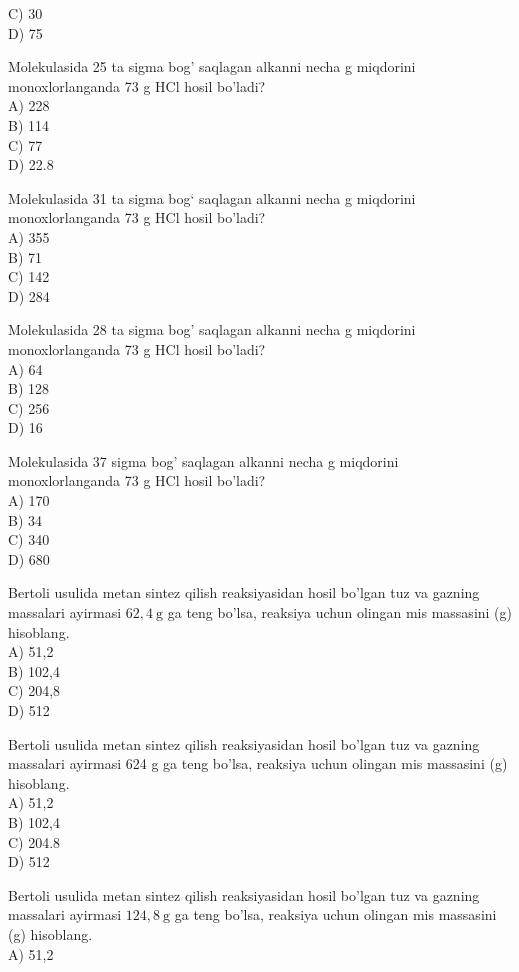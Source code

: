 C) 30\\
D) 75
  \item Molekulasida 25 ta sigma bog' saqlagan alkanni necha g miqdorini monoxlorlanganda 73 g HCl hosil bo'ladi?\\
A) 228\\
B) 114\\
C) 77\\
D) 22.8
  \item Molekulasida 31 ta sigma bog` saqlagan alkanni necha g miqdorini monoxlorlanganda 73 g HCl hosil bo'ladi?\\
A) 355\\
B) 71\\
C) 142\\
D) 284
  \item Molekulasida 28 ta sigma bog' saqlagan alkanni necha g miqdorini monoxlorlanganda 73 g HCl hosil bo'ladi?\\
A) 64\\
B) 128\\
C) 256\\
D) 16
  \item Molekulasida 37 sigma bog' saqlagan alkanni necha g miqdorini monoxlorlanganda 73 g HCl hosil bo'ladi?\\
A) 170\\
B) 34\\
C) 340\\
D) 680
  \item Bertoli usulida metan sintez qilish reaksiyasidan hosil bo'lgan tuz va gazning massalari ayirmasi $62,4 \mathrm{~g}$ ga teng bo'lsa, reaksiya uchun olingan mis massasini (g) hisoblang.\\
A) 51,2\\
B) 102,4\\
C) 204,8\\
D) 512
  \item Bertoli usulida metan sintez qilish reaksiyasidan hosil bo'lgan tuz va gazning massalari ayirmasi 624 g ga teng bo'lsa, reaksiya uchun olingan mis massasini (g) hisoblang.\\
A) 51,2\\
B) 102,4\\
C) 204.8\\
D) 512
  \item Bertoli usulida metan sintez qilish reaksiyasidan hosil bo'lgan tuz va gazning massalari ayirmasi $124,8 \mathrm{~g}$ ga teng bo'lsa, reaksiya uchun olingan mis massasini (g) hisoblang.\\
A) 51,2\\
